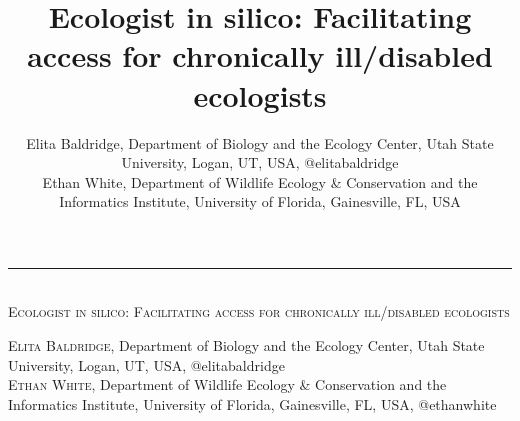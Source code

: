 \documentclass{beamer}
\author{Elita Baldridge, Department of Biology and the Ecology Center, Utah State University, Logan, UT, USA, @elitabaldridge\\Ethan White, Department of Wildlife Ecology \& Conservation and the Informatics Institute, University of Florida, Gainesville, FL, USA}
\title[17pt]{Ecologist in silico: Facilitating access for chronically ill/disabled ecologists}
\date{}
\begin{document}
\begin{center} 
\begin{huge}
\rule{\linewidth}{0.25cm}
\textsc{%
\\Ecologist in silico: Facilitating access for chronically ill/disabled ecologists\\
 }
\end{huge}  
\begin{large}
\textsc{Elita Baldridge}, Department of Biology and the Ecology Center, Utah State University, Logan, UT, USA, @elitabaldridge\\  
\textsc{Ethan White}, Department of Wildlife Ecology \& Conservation and the Informatics Institute, University of Florida, Gainesville, FL, USA, @ethanwhite\\
\end{large}
\end{center}
\end{document}
